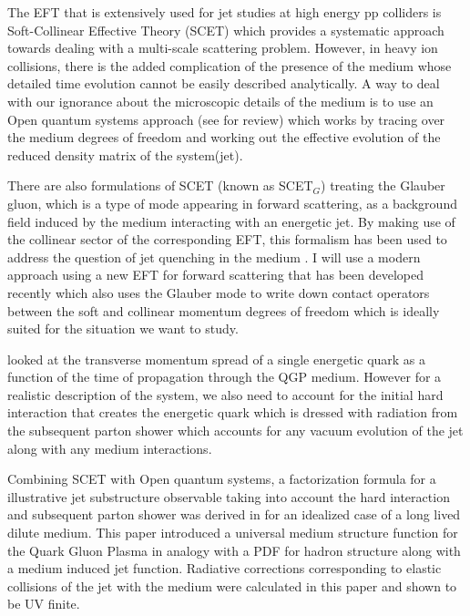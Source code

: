 \documentclass[letter,11pt]{article}
\begin{document}
 The EFT that is extensively used for jet studies at high energy pp colliders is Soft-Collinear Effective Theory (SCET) which provides a systematic approach towards dealing with a multi-scale scattering problem. However, in heavy ion collisions, there is the added complication of the presence of the medium whose detailed time evolution cannot be easily described analytically. A way to deal with our ignorance about the microscopic details of the medium is to use an Open quantum systems approach (see \cite{Breuer:2002pc,OQS} for review) which works by tracing over the medium degrees of freedom and working out the effective evolution of the reduced density matrix of the system(jet). 

There are also formulations of SCET (known as SCET$_G$) treating the Glauber gluon, which is a type of mode appearing in forward scattering, as a background field induced by the medium interacting with an energetic jet. By making use of the collinear sector of the corresponding  EFT, this formalism has been used to address the question of jet quenching in the medium \cite{Ovanesyan:2011kn,Chien:2015hda,Ovanesyan:2011xy,Chien:2015vja,Kang:2014xsa}. I will use a modern approach using a new EFT for forward scattering that has been developed recently \cite{Rothstein:2016bsq} which also uses the Glauber mode to write down contact operators between the soft and collinear momentum degrees of freedom which is ideally suited for the situation we want to study. 

 \cite{Vaidya:2020cyi} looked at the transverse momentum spread of a single energetic quark as a function of the time of propagation through the QGP medium. However for a realistic description of the system, we also need to account for the initial hard interaction that creates  the energetic quark which is dressed with radiation from the subsequent parton shower which accounts for any vacuum evolution of the jet along with any medium interactions.

Combining SCET with Open quantum systems, a factorization formula for a illustrative jet substructure observable taking into account the hard interaction and subsequent parton shower was derived in \cite{Vaidya:2020lih} for an  idealized case of a long lived dilute medium. This paper introduced a universal medium structure function for the Quark Gluon Plasma in analogy with a PDF for hadron structure along with a medium induced jet function. Radiative corrections corresponding to elastic collisions of the jet with the medium were calculated in this paper and shown to be UV finite. 
\end{document}
